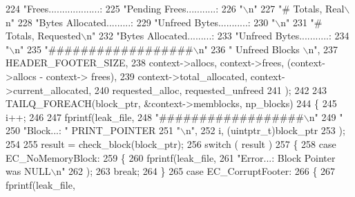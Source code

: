 \begin{DoxyCode}
{{224                 \textcolor{stringliteral}{"Frees...................: %
225                 \textcolor{stringliteral}{"Pending Frees...........: %
226                 \textcolor{stringliteral}{"\(\backslash\)n"}
227                 \textcolor{stringliteral}{"# Totals, Real\(\backslash\)n"}
228                 \textcolor{stringliteral}{"Bytes Allocated.........: %
229                 \textcolor{stringliteral}{"Unfreed Bytes...........: %
230                 \textcolor{stringliteral}{"\(\backslash\)n"}
231                 \textcolor{stringliteral}{"# Totals, Requested\(\backslash\)n"}
232                 \textcolor{stringliteral}{"Bytes Allocated.........: %
233                 \textcolor{stringliteral}{"Unfreed Bytes...........: %
234                 \textcolor{stringliteral}{"\(\backslash\)n"}
235                 \textcolor{stringliteral}{"##################\(\backslash\)n"}
236                 \textcolor{stringliteral}{"  Unfreed Blocks  \(\backslash\)n"},
237                 HEADER_FOOTER_SIZE,
238                 context->allocs, context->frees, (context->allocs - context->
      frees),
239                 context->total_allocated, context->current_allocated,
240                 requested\_alloc, requested\_unfreed
241                 );
242 
243         TAILQ_FOREACH(block\_ptr, &context->memblocks, np\_blocks)
244         \{
245                 i++;
246 
247                 fprintf(leak\_file,
248                         \textcolor{stringliteral}{"##################\(\backslash\)n"}
249                         \textcolor{stringliteral}{"%
250                         \textcolor{stringliteral}{"Block...: "} PRINT_POINTER
251                         \textcolor{stringliteral}{"\(\backslash\)n"},
252                         i, (uintptr\_t)block\_ptr
253                 );
254 
255                 result = check_block(block\_ptr);
256                 \textcolor{keywordflow}{switch} ( result )
257                 \{
258                 \textcolor{keywordflow}{case} EC_NoMemoryBlock:
259                         \{
260                                 fprintf(leak\_file,
261                                         \textcolor{stringliteral}{"Error...: Block Pointer was NULL\(\backslash\)n"}
262                                 );
263                                 \textcolor{keywordflow}{break};
264                         \}
265                 \textcolor{keywordflow}{case} EC_CorruptFooter:
266                         \{
267                                 fprintf(leak\_file,
}}}}}}}}}
\end{DoxyCode}
